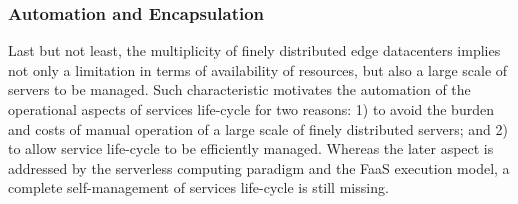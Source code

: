 	
\subsubsection*{Automation and Encapsulation}


Last but not least, the multiplicity of finely distributed edge datacenters implies not only a limitation in terms of availability of resources, but also a large scale of servers to be managed. Such characteristic motivates the automation of the operational aspects of services life-cycle for two reasons: 1) to avoid the burden and costs of manual operation of a large scale of finely distributed servers; and 2) to allow service life-cycle to be efficiently managed. Whereas the later aspect is addressed by the serverless computing paradigm and the FaaS execution model, a complete self-management of services life-cycle is still missing.









